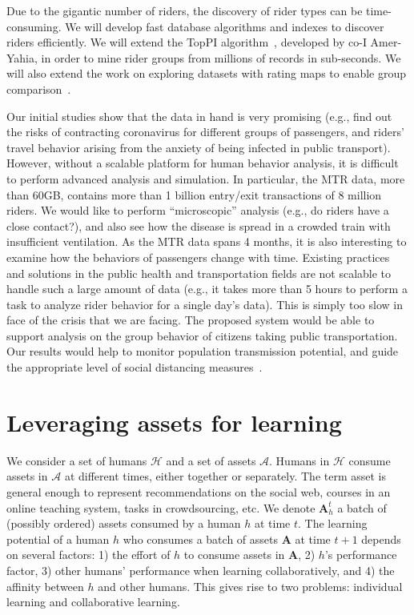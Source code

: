 \documentclass[11pt]{article}
\begin{document}
Due to the gigantic number of riders, the discovery of rider types can be time-consuming. We will develop fast database algorithms and indexes to discover riders efficiently. We will  extend the TopPI algorithm~\cite{DBLP:journals/is/LeroyKTA17}, developed by co-I Amer-Yahia, in order to mine rider groups from millions of records in sub-seconds. We will also extend the work on exploring datasets with rating maps to enable group comparison~\cite{DBLP:conf/www/Amer-YahiaKKLZ17}.

Our initial studies show that the data in hand is very promising (e.g., find out the risks of contracting coronavirus for different groups of passengers, and riders' travel behavior arising from the anxiety of being infected in public transport). However, without a scalable platform for human behavior analysis, it is difficult to perform advanced analysis and simulation. In particular, the MTR data, more than 60GB, contains more than 1 billion entry/exit transactions of 8 million riders. We would like to perform ``microscopic'' analysis (e.g., do riders have a close contact?), and also see how the disease is spread in a crowded train with insufficient ventilation. As the MTR data spans 4  months, it is also interesting to examine how the behaviors of passengers change with time. Existing practices and solutions in the public health and transportation fields are not scalable to handle such a large amount of data (e.g., it takes more than 5 hours to perform a task to analyze rider behavior for a single day's data).  This is simply too slow in face of the crisis that we are facing. The proposed system would be able to support analysis on the group behavior of citizens taking public transportation. Our results would help to monitor population transmission potential, and guide the appropriate level of social distancing measures~\cite{buckee20}.

\section{Leveraging assets for learning}
We consider a set of humans $\mathcal{H}$ and a set of assets $\mathcal{A}$. Humans in $\mathcal{H}$ consume assets in $\mathcal{A}$ at different times, either together or separately. The term asset is general enough to represent recommendations on the social web, courses in an online teaching system, tasks in crowdsourcing, etc. We denote $\mathbf{A}_h^t$ a batch of (possibly ordered) assets consumed by a human $h$ at time $t$. The learning potential of a human $h$ who consumes a batch of assets {\bf A} at time $t+1$ depends on several factors: 1) the effort of $h$ to consume assets in {\bf A}, 2) $h$'s performance factor, 3) other humans' performance when learning collaboratively, and 4) the affinity between $h$ and other humans. This gives rise to two problems: individual learning and collaborative learning.
 
\end{document}
